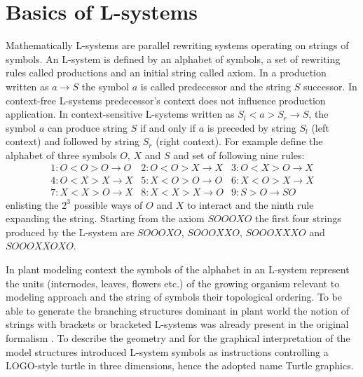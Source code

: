 \section{Basics of L-systems}

Mathematically L-systems  are parallel rewriting  systems operating on
strings of symbols. An L-system  is defined by an alphabet of symbols,
a  set of  rewriting rules  called productions  and an  initial string
called axiom. In a production  written as $a \rightarrow S$ the symbol
$a$  is   called  predecessor  and  the  string   $S$  successor.   In
context-free  L-systems  predecessor's   context  does  not  influence
production  application.  In  context-sensitive  L-systems written  as
$S_l < a  > S_r \rightarrow S$, the symbol $a$  can produce string $S$
if and  only if  $a$ is  preceded by string  $S_l$ (left  context) and
followed  by string  $S_r$ (right  context).  For  example  define the
alphabet of three  symbols $O$, $X$ and $S$ and  set of following nine
rules:
\begin{equation}\label{eq:ca110}
\begin{array}{lll}
1:O < O > O \rightarrow O & 2:O < O > X \rightarrow X &
3:O < X > O \rightarrow X \\ 
4:O < X > X \rightarrow X & 5:X < O > O \rightarrow O&
6:X < O > X \rightarrow X \\
7:X < X > O \rightarrow X & 8:X < X > X \rightarrow O & 
9:S > O \rightarrow SO
\end{array}
\end{equation}
enlisting the $2^3$  possible ways of $O$ and $X$  to interact and the
ninth rule expanding the string.  Starting from the axiom $SOOOXO$ the
first four  strings produced by the L-system  are $SOOOXO$, $SOOOXXO$,
\linebreak $SOOOXXXO$ and $SOOOXXOXO$.

In plant modeling  context the symbols of the  alphabet in an L-system
represent the units (internodes, leaves, flowers etc.)  of the growing
organism relevant to modeling approach and the string of symbols their
topological ordering.  To be able to generate the branching structures
dominant  in  plant world  the  notion  of  strings with  brackets  or
bracketed  L-systems was  already  present in  the original  formalism
\citep{lindenmayer:68}. To describe the geometry and for the graphical
interpretation  of  the   model  structures  \citet{pp:86}  introduced
L-system  symbols  as  instructions  controlling a  LOGO-style  turtle
\citep{abelson:82} in three dimensions,  hence the adopted name Turtle
graphics.

